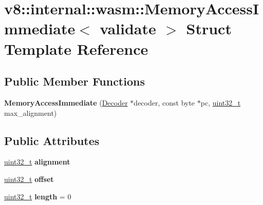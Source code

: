 \hypertarget{structv8_1_1internal_1_1wasm_1_1MemoryAccessImmediate}{}\section{v8\+:\+:internal\+:\+:wasm\+:\+:Memory\+Access\+Immediate$<$ validate $>$ Struct Template Reference}
\label{structv8_1_1internal_1_1wasm_1_1MemoryAccessImmediate}
\subsection*{Public Member Functions}
\begin{DoxyCompactItemize}
\item 
\mbox{\label{structv8_1_1internal_1_1wasm_1_1MemoryAccessImmediate_adf101a0511c68b5a575f9c2adaacd14d}} 
{\bfseries Memory\+Access\+Immediate} (\mbox{\hyperlink{classv8_1_1internal_1_1wasm_1_1Decoder}{Decoder}} $\ast$decoder, const byte $\ast$pc, \mbox{\hyperlink{classuint32__t}{uint32\+\_\+t}} max\+\_\+alignment)
\end{DoxyCompactItemize}
\subsection*{Public Attributes}
\begin{DoxyCompactItemize}
\item 
\mbox{\label{structv8_1_1internal_1_1wasm_1_1MemoryAccessImmediate_a1b1a3618f5b9e333cc0eb201a5700bf1}} 
\mbox{\hyperlink{classuint32__t}{uint32\+\_\+t}} {\bfseries alignment}
\item 
\mbox{\label{structv8_1_1internal_1_1wasm_1_1MemoryAccessImmediate_a249b022c7cba2edc5aa20717a28f7bf9}} 
\mbox{\hyperlink{classuint32__t}{uint32\+\_\+t}} {\bfseries offset}
\item 
\mbox{\label{structv8_1_1internal_1_1wasm_1_1MemoryAccessImmediate_af1bd95f7ebfb902c05eb40f678b69677}} 
\mbox{\hyperlink{classuint32__t}{uint32\+\_\+t}} {\bfseries length} = 0
\end{DoxyCompactItemize}


